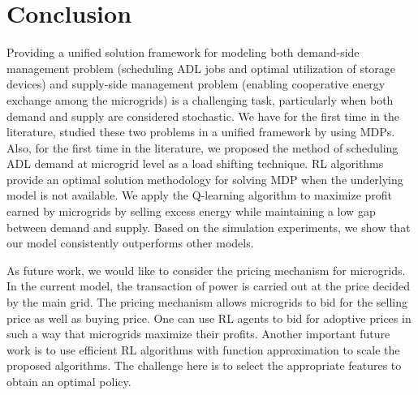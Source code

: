 \documentclass[conference]{IEEEtran}
\begin{document}
\section{Conclusion}\label{sec:conclusion}
Providing a unified solution framework for modeling both demand-side management problem (scheduling ADL jobs and optimal utilization of storage devices) and supply-side management problem (enabling cooperative energy exchange among the microgrids) is a challenging task, particularly when both demand and supply are considered stochastic. We have for the first time in the literature, studied these two problems in a unified framework by using MDPs. Also, for the first time in the literature, we proposed the method of scheduling ADL demand at microgrid level as a load shifting technique. RL algorithms provide an optimal solution methodology for solving MDP when the underlying model is not available. We apply the Q-learning algorithm to maximize profit earned by microgrids by selling excess energy while maintaining a low gap between demand and supply. Based on the simulation experiments, we show that our model consistently outperforms other models.

As future work, we would like to consider the pricing mechanism for microgrids. In the current model, the transaction of power is carried out at the price decided by the main grid. The pricing mechanism allows microgrids to bid for the selling price as well as buying price. One can use RL agents to bid for adoptive prices in such a way that microgrids maximize their profits. Another important future work is to use efficient RL algorithms with function approximation to scale the proposed algorithms. The challenge here is to select the appropriate features to obtain an optimal policy.




 
 
\end{document}

